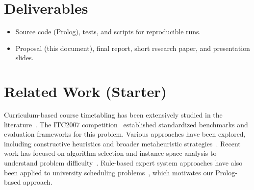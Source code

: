 \documentclass[11pt,letterpaper]{article}
\begin{document}
\section{Deliverables}
\begin{itemize}[nosep]
  \item Source code (Prolog), tests, and scripts for reproducible runs.
  \item Proposal (this document), final report, short research paper, and presentation slides.
\end{itemize}

\section{Related Work (Starter)}
Curriculum-based course timetabling has been extensively studied in the literature~\cite{bettinelli2015overview}. The ITC2007 competition~\cite{itc2007} established standardized benchmarks and evaluation frameworks for this problem. Various approaches have been explored, including constructive heuristics and broader metaheuristic strategies~\cite{qu2009survey}. Recent work has focused on algorithm selection and instance space analysis to understand problem difficulty~\cite{de2022algorithm}. Rule-based expert system approaches have also been applied to university scheduling problems~\cite{guyette1994rule}, which motivates our Prolog-based approach.



\end{document}
